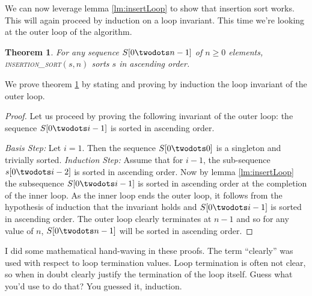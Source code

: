 \documentclass[]{tufte-handout}
\newtheorem{theorem}{Theorem}
\begin{document}
We can now leverage lemma \ref{lm:insertLoop} to show that insertion sort works.  This will again proceed by induction on a loop invariant. This time we're looking at the outer loop of the algorithm.

\begin{theorem}
For any sequence $S[0 \twodots n-1]$ of $n \geq 0$ elements, \textsc{insertion\_sort}$(s,n)$ sorts $s$ in ascending order.
\label{th:ISort-Skiena}
\end{theorem}

We prove theorem \ref{th:ISort-Skiena} by stating and proving by induction the loop invariant of the outer loop. 
\begin{proof}
Let us proceed by proving the following invariant of the outer loop: the sequence $S[0 \twodots i-1]$ is sorted in ascending order.

\textit{Basis Step:} Let $i=1$. Then the sequence $S[0 \twodots 0]$  is a singleton and trivially sorted.
\textit{Induction Step:} Assume that for $i-1$, the sub-sequence $s[0 \twodots i-2]$ is sorted in ascending order. Now by lemma \ref{lm:insertLoop} the subsequence $S[0 \twodots i-1]$ is sorted in ascending order at the completion of the inner loop.  As the inner loop ends the outer loop, it follows from the hypothesis of induction that the invariant holds and $S[0 \twodots i-1]$ is sorted in ascending order.  The outer loop clearly terminates at $n-1$ and so for any value of $n$, $S[0 \twodots n-1]$ will be sorted in ascending order.
\end{proof}

I did some mathematical hand-waving in these proofs.  The term ``clearly'' was used with respect to loop termination values.  Loop termination is often not clear, so when in doubt clearly justify the termination of the loop itself. Guess what you'd use to do that? You guessed it, induction.
\end{document}
